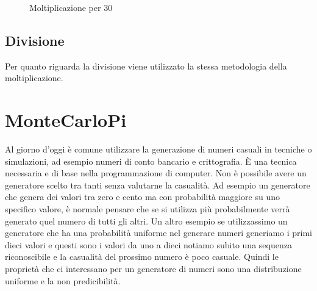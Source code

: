 \documentclass[12pt,a4paper]{report}
\begin{document}
\begin{figure}

     \begin{subfigure}[b]{0.3\textwidth}
  
        
         \label{Code:Mul30RISC}
	

     \end{subfigure}
     \hfill
     \begin{subfigure}[b]{0.3\textwidth}
         
          	
		
		 \label{Code:Mul30ARM}
     \end{subfigure}
     \hfill
     \begin{subfigure}[b]{0.3\textwidth}
         
          
	
	 \label{Code:Mul30X86}
     \end{subfigure}
     \caption{Moltiplicazione per 30}
     \end{figure}

\vspace{2cm}

\subsection{Divisione}
Per quanto riguarda la divisione viene utilizzato la stessa metodologia della moltiplicazione.


\section{MonteCarloPi}
Al giorno d'oggi è comune utilizzare la generazione di numeri casuali in tecniche o simulazioni, ad esempio numeri di conto bancario e crittografia. È una tecnica necessaria e di base nella programmazione di computer. Non è possibile avere un generatore scelto tra tanti senza valutarne la casualità. Ad esempio un generatore che genera dei valori tra zero e cento ma con probabilità maggiore su uno specifico valore, è normale pensare che se si utilizza più probabilmente verrà generato quel numero di tutti gli altri. Un altro esempio se utilizzassimo un generatore che ha  una probabilità uniforme nel generare numeri  generiamo i primi dieci valori e questi sono i valori da uno a dieci notiamo subito una sequenza riconoscibile e la casualità del prossimo numero è poco casuale.
Quindi le proprietà che ci interessano per un generatore di numeri sono una distribuzione uniforme e la non predicibilità.
\end{document}
